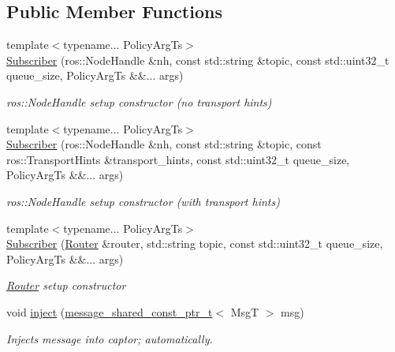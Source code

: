 \subsection*{Public Member Functions}
\begin{DoxyCompactItemize}
\item 
{\footnotesize template$<$typename... Policy\+Arg\+Ts$>$ }\\\hyperlink{classflow__ros_1_1_subscriber_ae47148b0782dd9d38cd68b7860751fe6}{Subscriber} (ros\+::\+Node\+Handle \&nh, const std\+::string \&topic, const std\+::uint32\+\_\+t queue\+\_\+size, Policy\+Arg\+Ts \&\&... args)
\begin{DoxyCompactList}\small\item\em {\ttfamily ros\+::\+Node\+Handle} setup constructor (no transport hints) \end{DoxyCompactList}\item 
{\footnotesize template$<$typename... Policy\+Arg\+Ts$>$ }\\\hyperlink{classflow__ros_1_1_subscriber_af772f601562ee99828bf1389f29d31f2}{Subscriber} (ros\+::\+Node\+Handle \&nh, const std\+::string \&topic, const ros\+::\+Transport\+Hints \&transport\+\_\+hints, const std\+::uint32\+\_\+t queue\+\_\+size, Policy\+Arg\+Ts \&\&... args)
\begin{DoxyCompactList}\small\item\em {\ttfamily ros\+::\+Node\+Handle} setup constructor (with transport hints) \end{DoxyCompactList}\item 
{\footnotesize template$<$typename... Policy\+Arg\+Ts$>$ }\\\hyperlink{classflow__ros_1_1_subscriber_a3110e656a138239c24339c57ea7259cc}{Subscriber} (\hyperlink{classflow__ros_1_1_router}{Router} \&router, std\+::string topic, const std\+::uint32\+\_\+t queue\+\_\+size, Policy\+Arg\+Ts \&\&... args)
\begin{DoxyCompactList}\small\item\em {\ttfamily \hyperlink{classflow__ros_1_1_router}{Router}} setup constructor \end{DoxyCompactList}\item 
\mbox{\label{classflow__ros_1_1_subscriber_acbe7aa4e4fcfd3c4406436ba9d917be6}} 
void \hyperlink{classflow__ros_1_1_subscriber_acbe7aa4e4fcfd3c4406436ba9d917be6}{inject} (\hyperlink{namespaceflow__ros_ad222b6c2bd0341c551129c3a03241ad7}{message\+\_\+shared\+\_\+const\+\_\+ptr\+\_\+t}$<$ MsgT $>$ msg)
\begin{DoxyCompactList}\small\item\em Injects message into captor; automatically. \end{DoxyCompactList}\end{DoxyCompactItemize}
